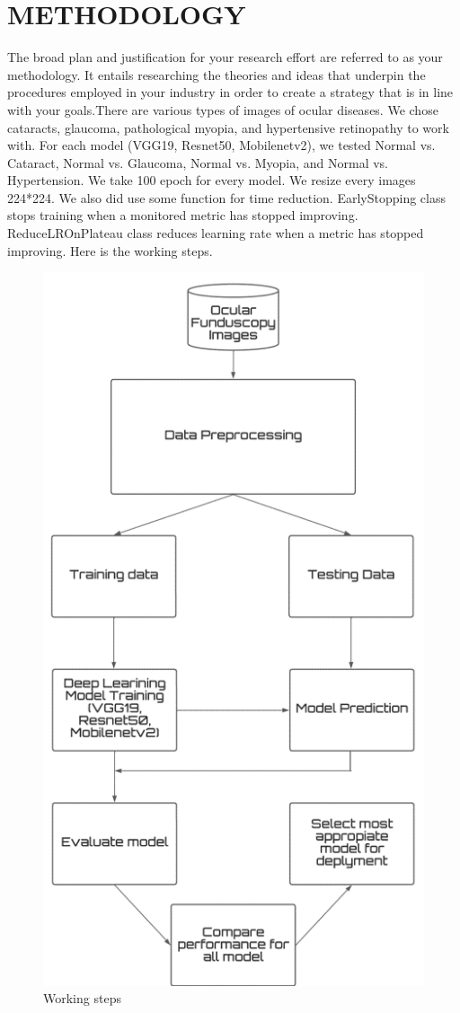 \chapter{METHODOLOGY}
The broad plan and justification for your research effort are referred to as your methodology. It entails researching the theories and ideas that underpin the procedures employed in your industry in order to create a strategy that is in line with your goals.There are various types of images of ocular diseases. We chose cataracts, glaucoma, pathological myopia, and hypertensive retinopathy to work with. For each model (VGG19, Resnet50, Mobilenetv2), we tested Normal vs. Cataract, Normal vs. Glaucoma, Normal vs. Myopia, and Normal vs. Hypertension. We take 100 epoch for every model. We resize every images 224*224. We also did use some function for time reduction. EarlyStopping class stops training when a monitored metric has stopped improving. ReduceLROnPlateau class reduces learning rate when a metric has stopped improving. Here is the working steps. 
\vspace{5pt}
\begin{figure}[H]
    \centering
    \includegraphics[scale=1]{3.png}
    \caption{Working steps}
    \label{Working steps}
\end{figure}
